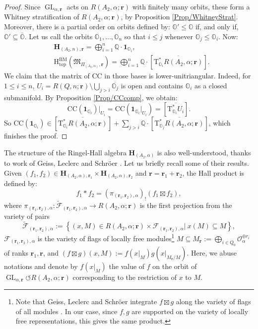\documentclass[11pt,english]{article}
\numberwithin{equation}{section}
\numberwithin{figure}{section}
\theoremstyle{definition}
\theoremstyle{plain}
\theoremstyle{remark}
\DeclareMathOperator{\GL}{GL}
\newcommand\rr{\mathbf{r}}
\newcommand\HH{\mathrm{H}}
\newcommand\QQ{\mathbb{Q}}
\begin{document}
\begin{proof}

Since $\GL_{\alpha,\rr}$ acts on $R(A_{2},\alpha;\rr)$ with finitely
many orbits, these form a Whitney stratification of $R(A_{2},\alpha;\rr)$,
by Proposition \ref{Prop/WhitneyStrat}. Moreover, there is a partial
order on orbits defined by: $\mathbb{O}'\leq\mathbb{O}$ if, and only
if, $\mathbb{O}'\subseteq\overline{\mathbb{O}}$. Let us call the
orbits $\mathbb{O}_{1},\ldots,\mathbb{O}_{n}$ so that $i\leq j$
whenever $\mathbb{O}_{j}\leq\mathbb{O}_{i}$. Now:\begin{align*}
& \mathbf{H}_{(A_{2},n),\rr}=\bigoplus_{i=1}^n\QQ\cdot\mathbf{1}_{\mathbb{O}_{i}}, \\
& \HH_{\mathrm{top}}^{\mathrm{BM}}\left(\mathfrak{M}_{\Pi_{(A_{2},\alpha)},\rr}\right)=\bigoplus_{i=1}^n\QQ\cdot [\overline{\mathrm{T}_{\mathbb{O}_{i}}^*R(A_{2},\alpha;\rr)}].
\end{align*}We claim that the matrix of $\mathrm{CC}$ in those bases is lower-unitriangular.
Indeed, for $1\leq i\leq n$, $U_{i}=R(Q,n;\rr)\setminus\bigcup_{j>i}\overline{\mathbb{O}_{j}}$
is open and contains $\mathbb{O}_{i}$ as a closed submanifold. By
Proposition \ref{Prop/CCcomp}, we obtain:\[
\mathrm{CC}(\mathbf{1}_{\mathbb{O}_{i}})\vert_{U_{i}}=\mathrm{CC}(\mathbf{1}_{\mathbb{O}_{i}}\vert_{U_{i}})=[\overline{\mathrm{T}_{\mathbb{O}_{i}}^*U_i}].
\]So $\mathrm{CC}(\mathbf{1}_{\mathbb{O}_{i}})\in[\overline{\mathrm{T}_{\mathbb{O}_{i}}^{*}R(A_{2},\alpha;\rr)}]+\sum_{j>i}\QQ\cdot[\overline{\mathrm{T}_{\mathbb{O}_{j}}^{*}R(A_{2},\alpha;\rr)}]$,
which finishes the proof. \end{proof}

The structure of the Ringel-Hall algebra $\mathbf{H}_{(A_{2},\alpha)}$
is also well-understood, thanks to work of Geiss, Leclerc and Schröer
\cite{GLS16}. Let us briefly recall some of their results. Given
$(f_{1},f_{2})\in\mathbf{H}_{(A_{2},\alpha),\rr_{1}}\times\mathbf{H}_{(A_{2},\alpha),\rr_{2}}$
and $\rr=\rr_{1}+\rr_{2}$, the Hall product is defined by:\[
f_1*f_2=\left(\pi_{(\rr_1,\rr_2),\alpha}\right)_!\left( f_1\boxtimes f_2\right)
,
\]where $\pi_{(\rr_{1},\rr_{2}),\alpha}:\tilde{\mathcal{F}}_{(\rr_{1},\rr_{2}),\alpha}\rightarrow R(A_{2},\alpha;\rr)$
is the first projection from the variety of pairs\[
\tilde{\mathcal{F}}_{(\rr_{1},\rr_{2}),\alpha}
:=
\left\{
(x,M)\in R(A_{2},\alpha;\rr)\times\mathcal{F}_{(\rr_{1},\rr_{2}),\alpha} \vert\ x(M)\subseteq M
\right\}
,
\]$\mathcal{F}_{(\rr_{1},\rr_{2}),\alpha}$ is the variety of flags
of locally free modules\footnote{Note that Geiss, Leclerc and Schröer integrate $f\boxtimes g$ along
the variety of flags of all modules \cite{GLS16}. In our case, since
$f,g$ are supported on the variety of locally free representations,
this gives the same product.} $M\subseteq M_{\rr}:=\bigoplus_{i\in Q_{0}}\mathcal{O}_{\alpha}^{\oplus r_{i}}$
of ranks $\rr_{1},\rr$, and $(f\boxtimes g)(x,M):=f(x\vert_{M})g(x\vert_{M_{\rr}/M})$.
Here, we abuse notations and denote by $f(x\vert_{M})$ the value
of $f$ on the orbit of $\GL_{\alpha,\rr}\circlearrowleft R(A_{2},\alpha;\rr)$
corresponding to the restriction of $x$ to $M$.
\end{document}
